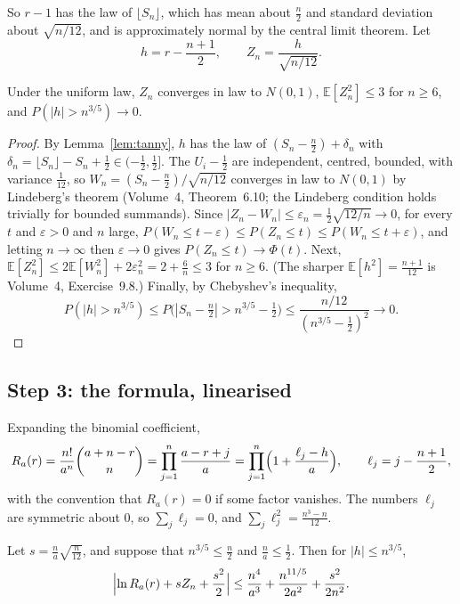 So $r-1$ has the law of $\lfloor S_n\rfloor$, which has mean about $\frac n2$ and standard deviation about $\sqrt{n/12}$, and is approximately normal by the central limit
theorem. Let
\[
h=r-\frac{n+1}2,\qquad Z_n=\frac h{\sqrt{n/12}}.
\]

\begin{lemma}\label{lem:risingclt}
Under the uniform law, $Z_n$ converges in law to $N(0,1)$, $\mathbb E[Z_n^2]\le3$ for $n\ge6$, and $P(|h|>n^{3/5})\to0$.
\end{lemma}

\begin{proof}
By Lemma~\ref{lem:tanny}, $h$ has the law of $(S_n-\frac n2)+\delta_n$ with $\delta_n=\lfloor S_n\rfloor-S_n+\frac12\in(-\frac12,\frac12]$. The $U_i-\frac12$ are independent, centred, bounded, with variance
$\frac1{12}$, so $W_n=(S_n-\frac n2)/\sqrt{n/12}$ converges in law to $N(0,1)$ by Lindeberg's theorem (Volume~4, Theorem~6.10; the Lindeberg condition holds trivially for
bounded summands). Since $|Z_n-W_n|\le\varepsilon_n=\frac12\sqrt{12/n}\to0$, for every $t$ and $\varepsilon>0$ and $n$ large, $P(W_n\le t-\varepsilon)\le P(Z_n\le t)\le P(W_n\le t+\varepsilon)$, and letting
$n\to\infty$ then $\varepsilon\to0$ gives $P(Z_n\le t)\to\Phi(t)$. Next, $\mathbb E[Z_n^2]\le2\mathbb E[W_n^2]+2\varepsilon_n^2=2+\frac6n\le3$ for $n\ge6$. (The sharper $\mathbb E[h^2]=\frac{n+1}{12}$ is Volume~4, Exercise~9.8.) Finally, by Chebyshev's inequality,
\[
P(|h|>n^{3/5})\le P\bigl(|S_n-\tfrac n2|>n^{3/5}-\tfrac12\bigr)\le\frac{n/12}{(n^{3/5}-\frac12)^2}\longrightarrow0.
\]
\end{proof}

\subsection*{Step 3: the formula, linearised}

Expanding the binomial coefficient,
\[
R_a(r)=\frac{n!}{a^n}\binom{a+n-r}n=\prod_{j=1}^n\frac{a-r+j}a=\prod_{j=1}^n\Bigl(1+\frac{\ell_j-h}a\Bigr),\qquad\ell_j=j-\frac{n+1}2,
\]
with the convention that $R_a(r)=0$ if some factor vanishes. The numbers $\ell_j$ are symmetric about $0$, so $\sum_j\ell_j=0$, and $\sum_j\ell_j^2=\frac{n^3-n}{12}$.

\begin{lemma}\label{lem:linearise}
Let $s=\frac{n}{a}\sqrt{\frac n{12}}$, and suppose that $n^{3/5}\le\frac n2$ and $\frac na\le\frac12$. Then for $|h|\le n^{3/5}$,
\[
\Bigl|\ln R_a(r)+sZ_n+\frac{s^2}2\Bigr|\le\frac{n^4}{a^3}+\frac{n^{11/5}}{2a^2}+\frac{s^2}{2n^2}.
\]
\end{lemma}

